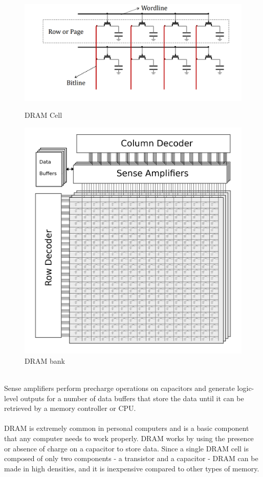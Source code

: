 \documentclass[11pt, conference, onecolumn]{IEEEtran}
\begin{document}
\begin{figure}[!tbp]
  \centering
  \begin{minipage}[b]{0.4\textwidth}
    \includegraphics[width=\textwidth]{dramcell.png}
    \caption{DRAM Cell}
  \end{minipage}
  \hfill
  \begin{minipage}[b]{0.4\textwidth}
    \includegraphics[width=\textwidth]{bank.png}
    \caption{DRAM bank}
  \end{minipage}
\end{figure}
\\Sense amplifiers perform precharge operations on capacitors and generate logic-level outputs for a number of data buffers that store the data until it can be retrieved by a memory controller or CPU.\\
\\DRAM is extremely common in personal computers and is a basic component that any computer needs to work properly. DRAM works by using the presence or absence of charge on a capacitor to store data. Since a single DRAM cell is composed of only two
components - a transistor and a capacitor - DRAM can be made in high densities, and it is inexpensive compared to other types of memory.\cite{b1}
\\
\\
\end{document}
